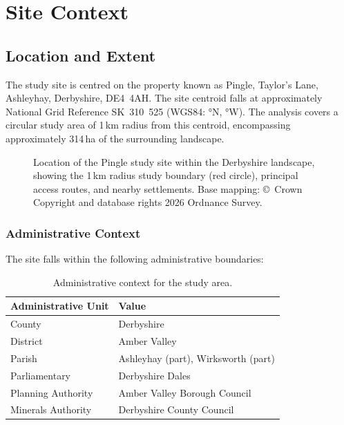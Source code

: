 \chapter{Site Context}
\label{ch:sitecontext}

\section{Location and Extent}

The study site is centred on the property known as Pingle, Taylor's Lane, Ashleyhay, Derbyshire, DE4~4AH. The site centroid falls at approximately National Grid Reference SK~310~525 (WGS84: °N, °W). The analysis covers a circular study area of 1\,km radius from this centroid, encompassing approximately 314\,ha of the surrounding landscape.

\begin{figure}[H]
\centering
{}
\caption{Location of the Pingle study site within the Derbyshire landscape, showing the 1\,km radius study boundary (red circle), principal access routes, and nearby settlements. Base mapping: \copyright\ Crown Copyright and database rights 2026 Ordnance Survey.}
\label{fig:site-location}
\end{figure}

\subsection{Administrative Context}

The site falls within the following administrative boundaries:

\begin{table}[H]
\centering
\caption{Administrative context for the study area.}
\label{tab:admin-context}
\begin{tabular}{ll}
\toprule
\textbf{Administrative Unit} & \textbf{Value} \\
\midrule
County                & Derbyshire \\
District              & Amber Valley \\
Parish                & Ashleyhay (part), Wirksworth (part) \\
Parliamentary         & Derbyshire Dales \\
Planning Authority    & Amber Valley Borough Council \\
Minerals Authority    & Derbyshire County Council \\
\bottomrule
\end{tabular}
\end{table}


